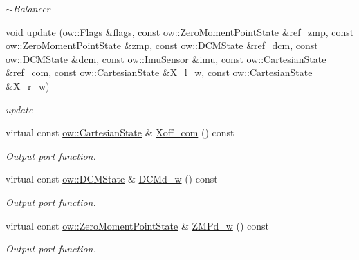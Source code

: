 \begin{DoxyCompactItemize}
\begin{DoxyCompactList}\small\item\em $\sim$\+Balancer \end{DoxyCompactList}\item 
void \hyperlink{classow__balancer_1_1Balancer_a7f3f8c0d771ce29d059ae418aba0bffb}{update} (\hyperlink{classow__core_1_1Flags}{ow\+::\+Flags} \&flags, const \hyperlink{classow__core_1_1ZeroMomentPointState}{ow\+::\+Zero\+Moment\+Point\+State} \&ref\+\_\+zmp, const \hyperlink{classow__core_1_1ZeroMomentPointState}{ow\+::\+Zero\+Moment\+Point\+State} \&zmp, const \hyperlink{classow__core_1_1DivergentComponentOfMotionState}{ow\+::\+D\+C\+M\+State} \&ref\+\_\+dcm, const \hyperlink{classow__core_1_1DivergentComponentOfMotionState}{ow\+::\+D\+C\+M\+State} \&dcm, const \hyperlink{classow__core_1_1InertialMeasurmentUnitSensor}{ow\+::\+Imu\+Sensor} \&imu, const \hyperlink{classow__core_1_1CartesianState}{ow\+::\+Cartesian\+State} \&ref\+\_\+com, const \hyperlink{classow__core_1_1CartesianState}{ow\+::\+Cartesian\+State} \&X\+\_\+l\+\_\+w, const \hyperlink{classow__core_1_1CartesianState}{ow\+::\+Cartesian\+State} \&X\+\_\+r\+\_\+w)
\begin{DoxyCompactList}\small\item\em update \end{DoxyCompactList}\item 
virtual const \hyperlink{classow__core_1_1CartesianState}{ow\+::\+Cartesian\+State} \& \hyperlink{classow__balancer_1_1Balancer_a75e68c66c09e370b4b670ed7fcdafcd6}{Xoff\+\_\+com} () const 
\begin{DoxyCompactList}\small\item\em Output port function. \end{DoxyCompactList}\item 
virtual const \hyperlink{classow__core_1_1DivergentComponentOfMotionState}{ow\+::\+D\+C\+M\+State} \& \hyperlink{classow__balancer_1_1Balancer_a09e9190ac09c6a4d1d1243f2db5bf8cb}{D\+C\+Md\+\_\+w} () const 
\begin{DoxyCompactList}\small\item\em Output port function. \end{DoxyCompactList}\item 
virtual const \hyperlink{classow__core_1_1ZeroMomentPointState}{ow\+::\+Zero\+Moment\+Point\+State} \& \hyperlink{classow__balancer_1_1Balancer_a49b1432ce68fbb056a5c9426c11c7122}{Z\+M\+Pd\+\_\+w} () const 
\begin{DoxyCompactList}\small\item\em Output port function. \end{DoxyCompactList}\end{DoxyCompactItemize}
